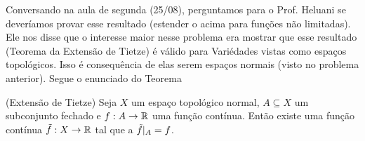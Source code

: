 

Conversando na aula de segunda (25/08), perguntamos para o Prof. Heluani se deveríamos provar esse resultado (estender o acima para funções não limitadas). 
Ele nos disse que o interesse maior nesse problema era mostrar que esse resultado (Teorema da Extensão de Tietze) é válido para Variédades vistas como 
espaços topológicos. Isso é consequência de elas serem espaços normais (visto no problema anterior). Segue o enunciado do Teorema
\begin{theorem}
    (Extensão de Tietze) Seja $X$ um espaço topológico normal, $A \subseteq X$ um subconjunto fechado e $f : A \rightarrow \mathbb{R}$ uma função contínua. Então existe 
    uma função contínua $\tilde{f}: X \rightarrow \mathbb{R}$ tal que a $\tilde{f}\arrowvert_A = f$. 
\end{theorem}

